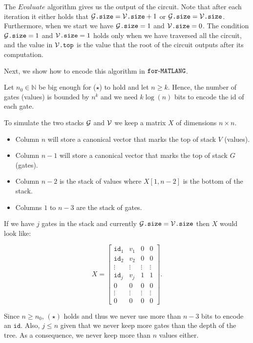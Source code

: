 The $Evaluate$ algorithm gives us the output of the circuit. Note that after each iteration it either holds that $\mathcal{G}\texttt{.size} =  \mathcal{V}\texttt{.size} + 1$ or $\mathcal{G}\texttt{.size} =  \mathcal{V}\texttt{.size}$. Furthermore, when we start we have $\mathcal{G}\texttt{.size}=1$ and $\mathcal{V}\texttt{.size}=0$. The condition $\mathcal{G}\texttt{.size}= 1$ and $\mathcal{V}\texttt{.size}=1$ holds only when we have traversed all the circuit, and the value in $\mathcal{V}\texttt{.top}$ is the value that the root of the circuit outputs after its computation.

Next, we show how to encode this algorithm in $\texttt{for}\text{-}\texttt{MATLANG}$.

Let $n_0\in\mathbb{N}$ be big enough for ($\star$) to hold and let $n\geq k$. Hence, the number of gates (values) is bounded by $n^k$ and we need $k\log (n)$ bits to encode the id of each gate.

To simulate the two stacks $\mathcal{G}$ and $\mathcal{V}$ we keep a matrix $X$ of dimensions $n \times n$.

\begin{itemize}
	\item Column $n$ will store a canonical vector that marks the top of stack $V$ (values).
	\item Column $n-1$ will store a canonical vector that marks the top of stack $G$ (gates).
	\item Column $n-2$ is the stack of values where $X[1, n-2]$ is the bottom of the stack.
	\item Columns $1$ to $n-3$ are the stack of gates.
\end{itemize}

If we have $j$ gates in the stack and currently $\mathcal{G}\texttt{.size}=\mathcal{V}\texttt{.size}$ then $X$ would look like:

\[
X = \begin{bmatrix}
    \texttt{id}_1 & v_1 & 0 & 0 \\
    \texttt{id}_2 & v_2 & 0 & 0 \\
    \vdots & \vdots & \vdots & \vdots \\
    \texttt{id}_j & v_j & 1 & 1 \\
    0 & 0 & 0 & 0 \\
    \vdots & \vdots & \vdots & \vdots \\
     0 & 0 & 0 & 0
\end{bmatrix}.
\]

Since $n\geq n_0$, $(\star)$ holds and thus we never use more than $n-3$ bits to encode an $\texttt{id}$. Also, $j\leq n$ given that we never keep more gates than the depth of the tree. As a consequence, we never keep more than $n$ values either.

